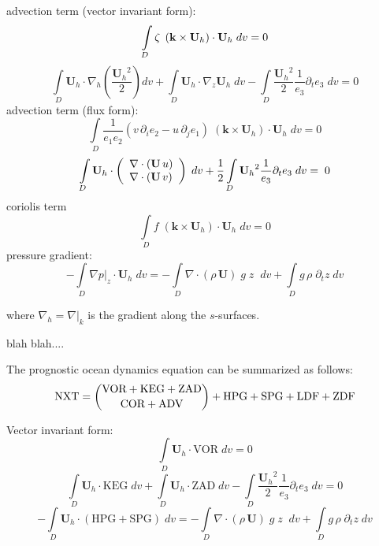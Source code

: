 \documentclass[../main/NEMO_manual]{subfiles}
\begin{document}
advection term (vector invariant form):
\[
  \int\limits_D  \zeta \; \left( \textbf{k} \times \textbf{U}_h  \right) \cdot \textbf{U}_h  \;  dv   = 0   \\
\]
\[
  \int\limits_D  \textbf{U}_h \cdot \nabla_h \left( \frac{{\textbf{U}_h}^2}{2} \right)     dv
  + \int\limits_D  \textbf{U}_h \cdot \nabla_z \textbf{U}_h  \;dv
  -  \int\limits_D { \frac{{\textbf{U}_h}^2}{2} \frac{1}{e_3} \partial_t e_3 \;dv }   = 0
\]
advection term (flux form):
\[
  \int\limits_D  \frac{1} {e_1 e_2 } \left( v \,\partial_i e_2 - u \,\partial_j e_1  \right)\;
  \left(  \textbf{k} \times \textbf{U}_h  \right) \cdot \textbf{U}_h  \;  dv   = 0
\]
\[
  \int\limits_D \textbf{U}_h \cdot     \left(                 {{
        \begin{array} {*{20}c}
          \nabla \cdot \left( \textbf{U}\,u \right) \hfill \\
          \nabla \cdot \left( \textbf{U}\,v \right) \hfill
        \end{array}}
    }           \right)   \;dv
  +   \frac{1}{2} \int\limits_D {  {\textbf{U}_h}^2 \frac{1}{e_3} \partial_t e_3 \;dv } =\;0
\]
coriolis term
\[
  \int\limits_D  f   \; \left( \textbf{k} \times \textbf{U}_h  \right) \cdot \textbf{U}_h  \;  dv   = 0
\]
pressure gradient:
\[
  - \int\limits_D  \left. \nabla p \right|_z \cdot \textbf{U}_h \;dv
  = - \int\limits_D \nabla \cdot \left( \rho \,\textbf {U} \right)\;g\;z\;\;dv
  + \int\limits_D g\, \rho \; \partial_t z  \;dv
\]

where $\nabla_h = \left. \nabla \right|_k$ is the gradient along the $s$-surfaces.

blah blah....

The prognostic ocean dynamics equation can be summarized as follows:
\[
  \text{NXT} = \dbinom	{\text{VOR} + \text{KEG} + \text {ZAD} }
  {\text{COR} + \text{ADV}                       }
  + \text{HPG} + \text{SPG} + \text{LDF} + \text{ZDF}
\]

Vector invariant form:
\[
  \int\limits_D   \textbf{U}_h \cdot \text{VOR} \;dv   = 0
\]
\[
  \int\limits_D  \textbf{U}_h \cdot \text{KEG}  \;dv
  + \int\limits_D  \textbf{U}_h \cdot \text{ZAD}  \;dv
  -  \int\limits_D { \frac{{\textbf{U}_h}^2}{2} \frac{1}{e_3} \partial_t e_3 \;dv }   = 0
\]
\[
  - \int\limits_D  \textbf{U}_h \cdot (\text{HPG}+ \text{SPG}) \;dv
  = - \int\limits_D \nabla \cdot \left( \rho \,\textbf {U} \right)\;g\;z\;\;dv
  + \int\limits_D g\, \rho \; \partial_t z  \;dv
\]
\end{document}
